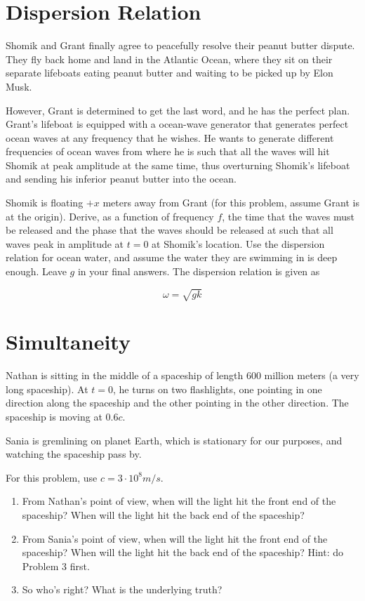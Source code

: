 \documentclass{article}
\begin{document}
\newpage

\section{Dispersion Relation}

Shomik and Grant finally agree to peacefully resolve their peanut butter dispute. They fly back home and land in the Atlantic Ocean, where they sit on their separate lifeboats eating peanut butter and waiting to be picked up by Elon Musk.

However, Grant is determined to get the last word, and he has the perfect plan. Grant's lifeboat is equipped with a ocean-wave generator that generates perfect ocean waves at any frequency that he wishes. He wants to generate different frequencies of ocean waves from where he is such that all the waves will hit Shomik at peak amplitude at the same time, thus overturning Shomik's lifeboat and sending his inferior peanut butter into the ocean.

Shomik is floating $+x$ meters away from Grant (for this problem, assume Grant is at the origin). Derive, as a function of frequency $f$, the time that the waves must be released and the phase that the waves should be released at such that all waves peak in amplitude at $t = 0$ at Shomik's location. Use the dispersion relation for ocean water, and assume the water they are swimming in is deep enough. Leave $g$ in your final answers. The dispersion relation is given as

$$\omega = \sqrt{gk}$$


\section{Simultaneity}

Nathan is sitting in the middle of a spaceship of length $600$ million meters (a very long spaceship). At $t = 0$, he turns on two flashlights, one pointing in one direction along the spaceship and the other pointing in the other direction. The spaceship is moving at $0.6c$.

Sania is gremlining on planet Earth, which is stationary for our purposes, and watching the spaceship pass by.

For this problem, use $c = 3 \cdot 10^8 m/s$.

\begin{enumerate}[label=(\alph*)]
    \item From Nathan's point of view, when will the light hit the front end of the spaceship? When will the light hit the back end of the spaceship?
    
    \item From Sania's point of view, when will the light hit the front end of the spaceship? When will the light hit the back end of the spaceship? Hint: do Problem 3 first.

    \item So who's right? What is the underlying truth?

\end{enumerate}
\end{document}
